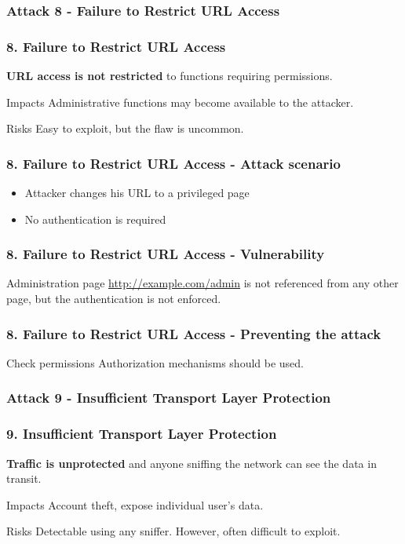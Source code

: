 \subsubsection{Attack 8 - Failure to Restrict URL Access}

\begin{frame}
\frametitle{8. Failure to Restrict URL Access}
\textbf{URL access is not restricted} to functions requiring permissions.
\begin{block}{Impacts}
Administrative functions may become available to the attacker.
\end{block}
\begin{block}{Risks}
\alert{Easy} to exploit, but the flaw is uncommon.
\end{block}
\end{frame}

\begin{frame}
\frametitle{8. Failure to Restrict URL Access - Attack scenario}
\begin{itemize}
\item Attacker changes his URL to a privileged page
\item No authentication is required
\end{itemize}
\end{frame}

\begin{frame}
\frametitle{8. Failure to Restrict URL Access - Vulnerability}
\begin{exampleblock}{Administration page}
\url{http://example.com/admin} is not referenced from any other page, but
the authentication is not enforced.
\end{exampleblock}
\end{frame}

\begin{frame}
\frametitle{8. Failure to Restrict URL Access - Preventing the attack}
\begin{block}{Check permissions}
Authorization mechanisms should be used.
\end{block}
\end{frame}

\subsubsection{Attack 9 - Insufficient Transport Layer Protection}

\begin{frame}
\frametitle{9. Insufficient Transport Layer Protection}
\textbf{Traffic is unprotected} and anyone sniffing the network can see the
data in transit.
\begin{block}{Impacts}
Account theft, expose individual user's data.
\end{block}
\begin{block}{Risks}
\alert{Detectable} using any sniffer.
However, often difficult to exploit.
\end{block}
\end{frame}

